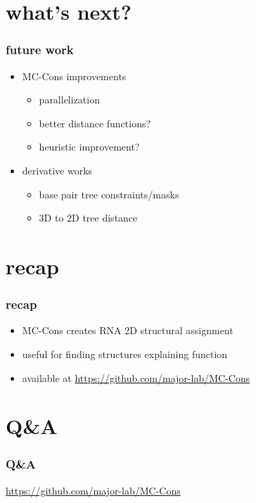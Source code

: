 \documentclass{beamer}
\begin{document}
\section{what's next?}
\begin{frame}
	\frametitle{future work}
	\begin{itemize}
		\item MC-Cons improvements
		\begin{itemize}
			\item parallelization
			\item better distance functions?
			\item heuristic improvement?
		\end{itemize}
		
		\item derivative works
		\begin{itemize}
			\item base pair tree constraints/masks
			\item 3D to 2D tree distance
		\end{itemize}				

	\end{itemize}
\end{frame}



\section{recap}

\begin{frame}
	\frametitle{recap}
	\begin{itemize}
		\item MC-Cons creates RNA 2D structural assignment
		\item useful for finding structures explaining function
		\item available at \url{https://github.com/major-lab/MC-Cons}
	\end{itemize}
\end{frame}

\section{Q\&A}

\begin{frame}
	\frametitle{Q\&A}
		\url{https://github.com/major-lab/MC-Cons}
\end{frame}
\end{document}
